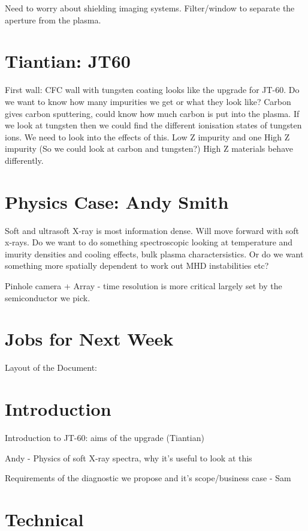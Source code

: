 \documentclass[11pt]{article}
\begin{document}
Need to worry about shielding imaging systems. Filter/window to separate the aperture from the plasma. 

\section{Tiantian: JT60}

First wall: CFC wall with tungsten coating looks like the upgrade for JT-60. Do we want to know how many impurities we get or what they look like? Carbon gives carbon sputtering, could know how much carbon is put into the plasma. If we look at tungsten then we could find the different ionisation states of tungsten ions. We need to look into the effects of this. Low Z impurity and one High Z impurity (So we could look at carbon and tungsten?) High Z materials behave differently. 

\section{Physics Case: Andy Smith} 

Soft and ultrasoft X-ray is most information dense. Will move forward with soft x-rays. Do we want to do something spectroscopic looking at temperature and imurity densities and cooling effects, bulk plasma charactersistics. Or do we want something more spatially dependent to work out MHD instabilities etc? 

Pinhole camera + Array  - time resolution is more critical largely set by the semiconductor we pick. 

\section{Jobs for Next Week}

Layout of the Document:

\section{Introduction} 

Introduction to JT-60: aims of the upgrade (Tiantian)

Andy - Physics of soft X-ray spectra, why it's useful to look at this

Requirements of the diagnostic we propose and it's scope/business case - Sam

\section{Technical}
\end{document}
